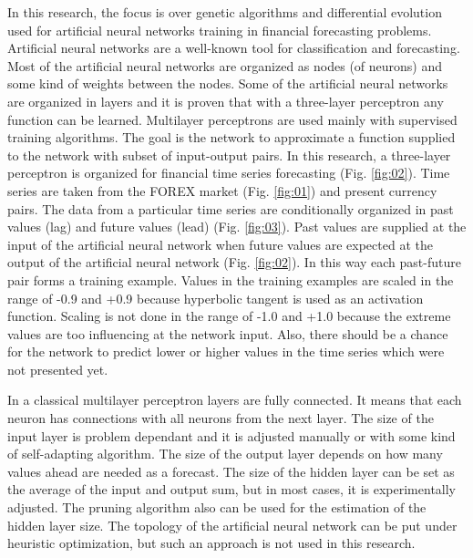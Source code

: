 \documentclass[graybox]{svmult}
\begin{document}
In this research, the focus is over genetic algorithms and differential evolution used for artificial neural networks training in financial forecasting problems. Artificial neural networks are a well-known tool for classification and forecasting. Most of the artificial neural networks are organized as nodes (of neurons) and some kind of weights between the nodes. Some of the artificial neural networks are organized in layers and it is proven that with a three-layer perceptron any function can be learned. Multilayer perceptrons are used mainly with supervised training algorithms. The goal is the network to approximate a function supplied to the network with subset of input-output pairs. In this research, a three-layer perceptron is organized for financial time series forecasting (Fig. \ref{fig:02}). Time series are taken from the FOREX market (Fig. \ref{fig:01}) and present currency pairs. The data from a particular time series are conditionally organized in past values (lag) and future values (lead) (Fig. \ref{fig:03}). Past values are supplied at the input of the artificial neural network when future values are expected at the output of the artificial neural network (Fig. \ref{fig:02}). In this way each past-future pair forms a training example. Values in the training examples are scaled in the range of -0.9 and +0.9 because hyperbolic tangent is used as an activation function. Scaling is not done in the range of -1.0 and +1.0 because the extreme values are too influencing at the network input. Also, there should be a chance for the network to predict lower or higher values in the time series which were not presented yet. 

In a classical multilayer perceptron layers are fully connected. It means that each neuron has connections with all neurons from the next layer. The size of the input layer is problem dependant and it is adjusted manually or with some kind of self-adapting algorithm. The size of the output layer depends on how many values ahead are needed as a forecast. The size of the hidden layer can be set as the average of the input and output sum, but in most cases, it is experimentally adjusted. The pruning algorithm also can be used for the estimation of the hidden layer size. The topology of the artificial neural network can be put under heuristic optimization, but such an approach is not used in this research. 
\end{document}
